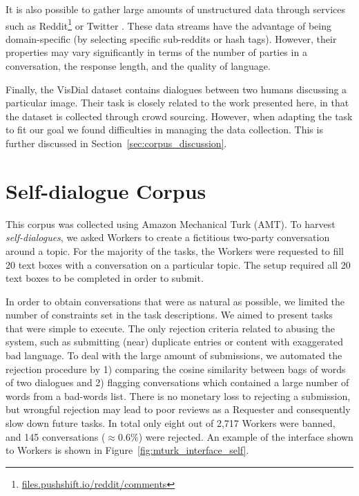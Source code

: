\documentclass[11pt,a4paper]{article}
\begin{document}
It is also possible to gather large amounts of unstructured data through services such as Reddit\footnote{\url{files.pushshift.io/reddit/comments}} or Twitter  \cite{ritter2010unsupervised,shang2015neural}. These data streams have the advantage of being domain-specific (by selecting specific sub-reddits or hash tags). However, their properties may vary significantly in terms of the number of parties in a conversation, the response length, and the quality of language. %

Finally, the VisDial dataset \cite{DBLP:journals/corr/DasKGSYMPB16} contains dialogues between two humans discussing a particular image. Their task is closely related to the work presented here, in that the dataset is collected through crowd sourcing. However, when adapting the task to fit our goal we found difficulties in managing the data collection. This is further discussed in Section~\ref{sec:corpus_discussion}.

\section{Self-dialogue Corpus}

This corpus was collected using Amazon Mechanical Turk (AMT). To harvest \textit{self-dialogues}, we asked Workers to create a fictitious two-party conversation around a topic.
For the majority of the tasks, the Workers were requested to fill 20 text boxes with a conversation on a particular topic. The setup required all 20 text boxes to be completed in order to submit.

In order to obtain conversations that were as natural as possible, we limited the number of constraints set in the task descriptions. We aimed to present tasks that were simple to execute. The only rejection criteria related to abusing the system, such as submitting (near) duplicate entries or content with exaggerated bad language. To deal with the large amount of submissions, we automated the rejection procedure by 1) comparing the cosine similarity between bags of words of two dialogues and 2) flagging conversations which contained a large number of words from a bad-words list. There is no monetary loss to rejecting a submission, but wrongful rejection may lead to poor reviews as a Requester and consequently slow down future tasks. In total only eight out of 2,717 Workers were banned, and 145 conversations ($\approx 0.6\%$) were rejected. An example of the interface shown to Workers is shown in Figure~\ref{fig:mturk_interface_self}.
\end{document}

